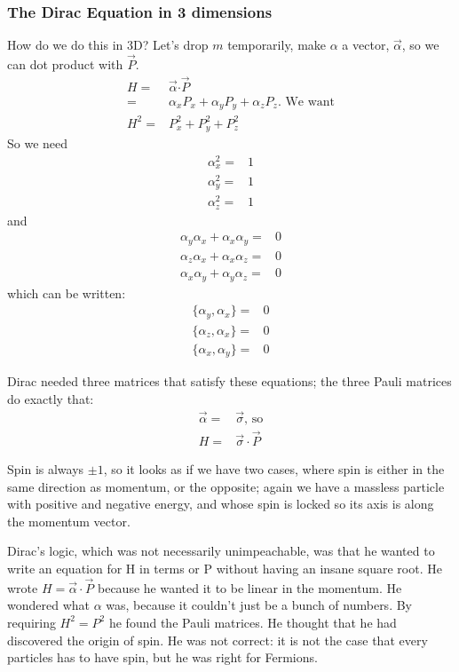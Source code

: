 \documentclass[]{article}
\begin{document}
\subsubsection{The Dirac Equation in 3 dimensions}

 How do we do this in 3D? Let's  drop $m$ temporarily, make $\alpha$ a vector, $\vec{\alpha}$, so we can dot product with $\vec{P}$.
\begin{align*}
	H =& \vec{\alpha} \boldsymbol{\cdot} \vec{P}\\
	=& \alpha_x P_x + \alpha_y P_y + \alpha_z P_z \text{. We want}\\
	H^2 =& P_x^2 + P_y^2 + P_z^2
\end{align*}
So we need
\begin{align*}
	\alpha_x^2 =&1\\
	\alpha_y^2 =&1\\
	\alpha_z^2 =&1
\end{align*}
and
\begin{align*}
	\alpha_y\alpha_x + \alpha_x\alpha_y=&0\\
	\alpha_z\alpha_x + \alpha_x\alpha_z=&0\\
	\alpha_x\alpha_y + \alpha_y\alpha_z=&0
\end{align*}
which can be written:
\begin{align*}
	\{\alpha_y,\alpha_x\} =&0\\
	\{\alpha_z,\alpha_x\} =&0\\
	\{\alpha_x,\alpha_y\} =&0
\end{align*}

Dirac needed three matrices that satisfy these equations; the three Pauli matrices do exactly that:
\begin{align*}
	\vec{\alpha}=&\vec{\sigma} \text{, so}\\
	H =& \vec{\sigma} \cdot \vec{P}
\end{align*}

Spin is always $\pm 1$, so it looks as if we have two cases, where spin is either in the same direction as momentum, or the opposite; again we have a massless particle with positive and negative energy, and whose spin is locked so its axis is along the momentum vector.

Dirac's logic, which was not necessarily unimpeachable, was that he wanted to write an equation for H in terms or P without having an insane square root. He wrote $	H = \vec{\alpha} \cdot \vec{P}$ because he wanted it to be linear in the momentum. He wondered what $\alpha$ was, because it couldn't just be a bunch of numbers. By requiring $H^2=P^2$ he found the Pauli matrices. He thought that he had discovered the origin of spin. He was not correct: it is not the case that every particles has to have spin, but he was right for Fermions.
\end{document}
